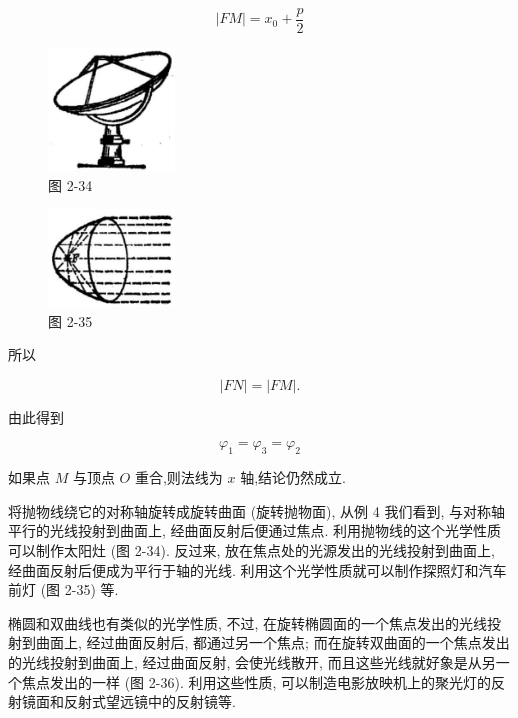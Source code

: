 \documentclass[lang=cn,newtx,10pt,scheme=chinese]{elegantbook}
\begin{document}
\[
  \left| {FM}\right| = {x}_{0} + \frac{p}{2}
\]

\begin{figure}[h]
  \centering
  \includegraphics[max width=0.3\textwidth]{images/01912cc2-ffb6-728e-9ae7-b113ff05c64b_123_742628.jpg}
  \caption{图 2-34}
\end{figure}



\begin{figure}[h]
  \centering
  \includegraphics[max width=0.3\textwidth]{images/01912cc2-ffb6-728e-9ae7-b113ff05c64b_123_478254.jpg}
  \caption{图 2-35}
\end{figure}



所以

\[
  \left| {FN}\right| = \left| {FM}\right| \text{.}
\]

由此得到

\[
    {\varphi }_{1} = {\varphi }_{3} = {\varphi }_{2}
\]

如果点 \(M\) 与顶点 \(O\) 重合,则法线为 \(x\) 轴,结论仍然成立.

将抛物线绕它的对称轴旋转成旋转曲面 (旋转抛物面), 从例 4 我们看到, 与对称轴平行的光线投射到曲面上, 经曲面反射后便通过焦点. 利用抛物线的这个光学性质可以制作太阳灶 (图 2-34). 反过来, 放在焦点处的光源发出的光线投射到曲面上, 经曲面反射后便成为平行于轴的光线. 利用这个光学性质就可以制作探照灯和汽车前灯 (图 2-35) 等.

椭圆和双曲线也有类似的光学性质, 不过, 在旋转椭圆面的一个焦点发出的光线投射到曲面上, 经过曲面反射后, 都通过另一个焦点; 而在旋转双曲面的一个焦点发出的光线投射到曲面上, 经过曲面反射, 会使光线散开, 而且这些光线就好象是从另一个焦点发出的一样 (图 2-36). 利用这些性质, 可以制造电影放映机上的聚光灯的反射镜面和反射式望远镜中的反射镜等.
\end{document}
